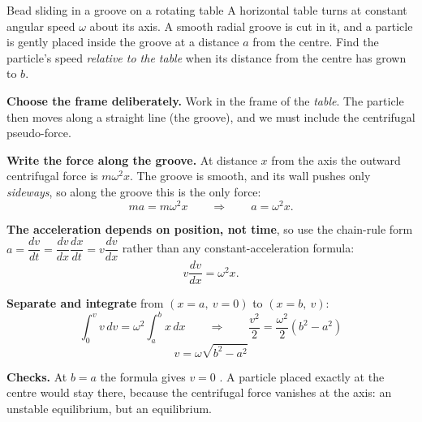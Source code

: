 \begin{exbox}{Bead sliding in a groove on a rotating table}
A horizontal table turns at constant angular speed $\omega$ about its axis. A smooth radial groove is
cut in it, and a particle is gently placed inside the groove at a distance $a$ from the centre. Find
the particle's speed \emph{relative to the table} when its distance from the centre has grown to $b$.

 \textbf{Choose the frame deliberately.} Work in the frame of the \emph{table}. The particle
then moves along a straight line (the groove), and we must include the centrifugal pseudo-force.

 \textbf{Write the force along the groove.} At distance $x$ from the axis the outward
centrifugal force is $m\omega^{2}x$. The groove is smooth, and its wall pushes only \emph{sideways}, so
along the groove this is the only force:
\[
ma = m\omega^{2}x
\qquad\Longrightarrow\qquad
a=\omega^{2}x.
\]

 \textbf{The acceleration depends on position, not time}, so use the chain-rule form
$a=\dfrac{dv}{dt}=\dfrac{dv}{dx}\dfrac{dx}{dt}=v\dfrac{dv}{dx}$ rather than any constant-acceleration
formula:
\[
v\frac{dv}{dx}=\omega^{2}x.
\]

 \textbf{Separate and integrate} from $(x=a,\ v=0)$ to $(x=b,\ v)$:
\[
\int_{0}^{v} v\,dv=\omega^{2}\int_{a}^{b} x\,dx
\qquad\Longrightarrow\qquad
\frac{v^{2}}{2}=\frac{\omega^{2}}{2}\left(b^{2}-a^{2}\right)
\]
\[
\boxed{\;v=\omega\sqrt{b^{2}-a^{2}}\;}
\]

\smallskip
\textbf{Checks.} At $b=a$ the formula gives $v=0$ \checkmark. A particle placed exactly at the centre
would stay there, because the centrifugal force vanishes at the axis: an unstable equilibrium, but an
equilibrium.
\end{exbox}

\begin{figure}[htbp]
\centering
{}
\end{figure}

